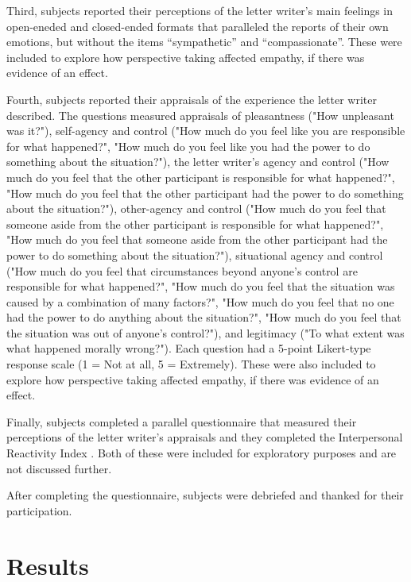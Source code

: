 \documentclass[man,a4paper,noextraspace,apacite]{apa6}\usepackage[]{graphicx}\usepackage[]{color}
\begin{document}
Third, subjects reported their perceptions of the letter writer's main feelings in open-eneded and closed-ended formats that paralleled the reports of their own emotions, but without the items ``sympathetic'' and ``compassionate''. These were included to explore how perspective taking affected empathy, if there was evidence of an effect.

Fourth, subjects reported their appraisals of the experience the letter writer described. The questions measured appraisals of pleasantness ("How unpleasant was it?"), self-agency and control ("How much do you feel like you are responsible for what happened?", "How much do you feel like you had the power to do something about the situation?"), the letter writer's agency and control ("How much do you feel that the other participant is responsible for what happened?", "How much do you feel that the other participant had the power to do something about the situation?"), other-agency and control ("How much do you feel that someone aside from the other participant is responsible for what happened?", "How much do you feel that someone aside from the other participant had the power to do something about the situation?"), situational agency and control ("How much do you feel that circumstances beyond anyone's control are responsible for what happened?", "How much do you feel that the situation was caused by a combination of many factors?", "How much do you feel that no one had the power to do anything about the situation?", "How much do you feel that the situation was out of anyone's control?"), and legitimacy ("To what extent was what happened morally wrong?"). Each question had a 5-point Likert-type response scale (1 = Not at all, 5 = Extremely). These were also included to explore how perspective taking affected empathy, if there was evidence of an effect.

Finally, subjects completed a parallel questionnaire that measured their perceptions of the letter writer's appraisals and they completed the Interpersonal Reactivity Index \cite{Davis1980, Davis1983}. Both of these were included for exploratory purposes and are not discussed further.

After completing the questionnaire, subjects were debriefed and thanked for their participation. 

\section{Results}
\end{document}
